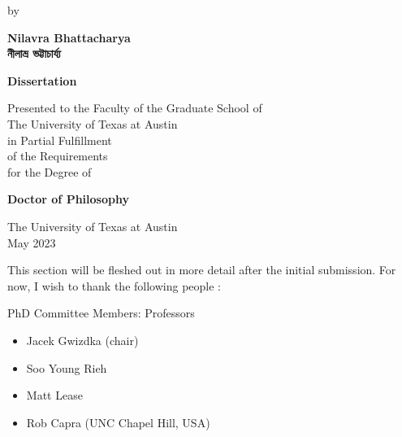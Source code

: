 \documentclass[letterpaper, nobind]{templates/ociamthesis}
\providecommand{\tightlist}{%
  \setlength{\itemsep}{0pt}\setlength{\parskip}{0pt}}
\begin{document}
\begin{romanpages}
\begin{center}
  \vspace*{24pt}

  \begin{spacing}{1.4}
    by\\
    
    \vspace*{24pt}
    
    {\Large{\textbf{
      Nilavra Bhattacharya\\
      \vspace*{10pt}
      {\Huge {\secondlanguage নীলাভ্র ভট্টাচার্য্য}}
    }}}
    
    \vspace*{72pt}
    
    {\Large{\textbf{Dissertation}}}\\
    
    \vspace*{24pt}
    
    Presented to the Faculty of the Graduate School of\\
    The University of Texas at Austin\\
    in Partial Fulfillment\\
    of the Requirements\\
    for the Degree of\\
    
    \vspace*{30pt}
    
    {\Large{\textbf{Doctor of Philosophy}}}\\
    
    \vfill

    {\large{The University of Texas at Austin\\
    May 2023}}

  \end{spacing}
\end{center}







\begin{acknowledgements}
 	This section will be fleshed out in more detail after the initial submission. For now, I wish to thank the following people :

 PhD Committee Members: Professors

 \begin{itemize}
 \tightlist
 \item
   Jacek Gwizdka (chair)
 \item
   Soo Young Rieh
 \item
   Matt Lease
 \item
   Rob Capra (UNC Chapel Hill, USA)
 \end{itemize}


\end{acknowledgements}
\end{romanpages}
\end{document}
